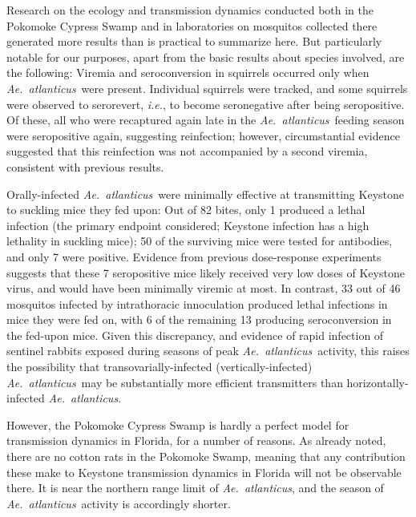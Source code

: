 \documentclass[12pt]{article}
\newcommand{\atl}{\textit{Ae.\ atlanticus}}
\newcommand{\ie}{\textit{i.e.}}
\newcommand{\cjh}{\textcolor{blue}{cjh}}
\newcommand{\msg}[3]{(#1 $\rightarrow$ #2: #3)}
\newcommand{\mcc}[1]{\msg\cjh\cjh{#1}}
\begin{document}
                Research on the ecology and transmission dynamics conducted both in the Pokomoke Cypress Swamp and in laboratories on mosquitos collected there generated more results than is practical to summarize here. But particularly notable for our purposes, apart from the basic results about species involved, are the following: Viremia and seroconversion in squirrels occurred only when \atl\ were present.\cite{watts1988maintenance} Individual squirrels were tracked, and some squirrels were observed to serorevert, \ie, to become seronegative after being seropositive. Of these, all who were recaptured again late in the \atl\ feeding season were seropositive again, suggesting reinfection; however, circumstantial evidence suggested that this reinfection was not accompanied by a second viremia\cite{watts1988maintenance}, consistent with previous results\cite{watts1979experimental}.
                
                Orally-infected \atl\ were minimally effective at transmitting Keystone to suckling mice they fed upon: Out of 82 bites, only 1 produced a lethal infection (the primary endpoint considered; Keystone infection has a high lethality in suckling mice); 50 of the surviving mice were tested for antibodies, and only 7 were positive.\cite{watts1988maintenance} Evidence from previous dose-response experiments suggests that these 7 seropositive mice likely received very low doses of Keystone virus, and would have been minimally viremic at most. In contrast, 33 out of 46 mosquitos infected by intrathoracic innoculation produced lethal infections in mice they were fed on\cite{watts1988maintenance}, with 6 of the remaining 13 producing seroconversion in the fed-upon mice. Given this discrepancy, and evidence of rapid infection of sentinel rabbits exposed during seasons of peak \atl\ activity\cite{jennings1968california,leduc1978natural}, this raises the possibility that transovarially-infected (vertically-infected) \atl\ may be substantially more efficient transmitters than horizontally-infected \atl.
            

                However, the Pokomoke Cypress Swamp is hardly a perfect model for transmission dynamics in Florida, for a number of reasons. As already noted, there are no cotton rats in the Pokomoke Swamp, meaning that any contribution these make to Keystone transmission dynamics in Florida will not be observable there. It is near the northern range limit of \atl, and the season of \atl\ activity is accordingly shorter.
\end{document}
